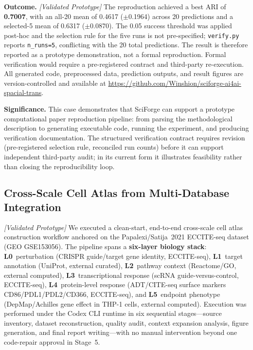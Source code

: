 \documentclass[sn-basic,Numbered,pdflatex]{sn-jnl}
\begin{document}
\textbf{Outcome.} \textit{[Validated Prototype]} The reproduction achieved a best ARI of \textbf{0.7007}, with an all-20 mean of 0.4617 ($\pm$0.1964) across 20 predictions and a selected-5 mean of 0.6317 ($\pm$0.0870). The 0.05 success threshold was applied post-hoc and the selection rule for the five runs is not pre-specified; \texttt{verify.py} reports \texttt{n\_runs=5}, conflicting with the 20 total predictions. The result is therefore reported as a prototype demonstration, not a formal reproduction. Formal verification would require a pre-registered contract and third-party re-execution. All generated code, preprocessed data, prediction outputs, and result figures are version-controlled and available at \url{https://github.com/Winshion/sciforge-ai4ai-spacial-trans}.

\textbf{Significance.} This case demonstrates that SciForge can support a prototype computational paper reproduction pipeline: from parsing the methodological description to generating executable code, running the experiment, and producing verification documentation. The structured verification contract requires revision (pre-registered selection rule, reconciled run counts) before it can support independent third-party audit; in its current form it illustrates feasibility rather than closing the reproducibility loop.

\subsection{Cross-Scale Cell Atlas from Multi-Database Integration}

\textit{[Validated Prototype]} We executed a clean-start, end-to-end cross-scale cell atlas construction workflow anchored on the Papalexi/Satija~2021 ECCITE-seq dataset (GEO GSE153056). The pipeline spans a \textbf{six-layer biology stack}: \textbf{L0}~perturbation (CRISPR guide/target gene identity, ECCITE-seq), \textbf{L1}~target annotation (UniProt, external curated), \textbf{L2}~pathway context (Reactome/GO, external computed), \textbf{L3}~transcriptional response (scRNA guide-versus-control, ECCITE-seq), \textbf{L4}~protein-level response (ADT/CITE-seq surface markers CD86/PDL1/PDL2/CD366, ECCITE-seq), and \textbf{L5}~endpoint phenotype (DepMap/Achilles gene effect in THP-1 cells, external computed). Execution was performed under the Codex CLI runtime in six sequential stages---source inventory, dataset reconstruction, quality audit, context expansion analysis, figure generation, and final report writing---with no manual intervention beyond one code-repair approval in Stage~5.
\end{document}
